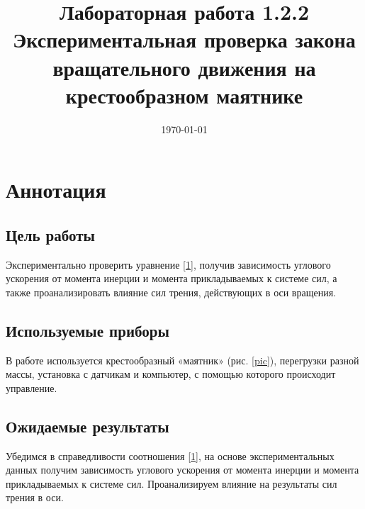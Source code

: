 \documentclass[a4paper,12pt]{article} %
\date{\today}
\title{Лабораторная работа 1.2.2 Экспериментальная проверка закона вращательного движения на крестообразном маятнике}
\date{}
\begin{document}
\maketitle

\section{Аннотация}
\subsection{Цель работы}
Экспериментально проверить уравнение \eqref{1}, получив зависимость углового ускорения от момента инерции и момента
прикладываемых к системе сил, а также проанализировать влияние
сил трения, действующих в оси вращения.

\subsection{Используемые приборы}
В работе используется крестообразный «маятник» (рис. \ref{pic}), перегрузки разной массы, установка с датчикам и компьютер, с помощью которого происходит управление.

\subsection{Ожидаемые результаты}
Убедимся в справедливости соотношения \eqref{1}, на основе экспериментальных данных получим зависимость углового ускорения от момента инерции и момента прикладываемых к системе сил. Проанализируем влияние на результаты сил трения в оси.
\end{document}
